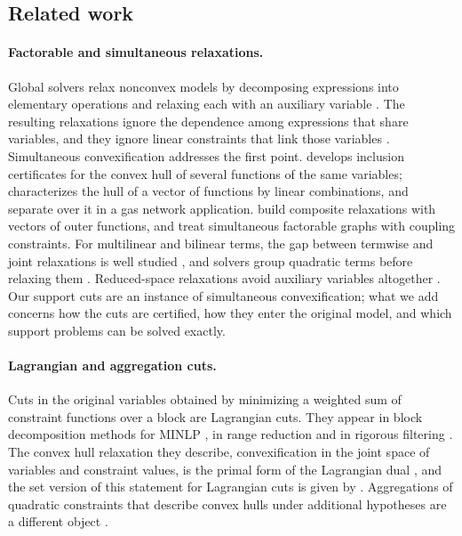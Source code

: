 \subsection{Related work}\label{sec:related}

\paragraph{Factorable and simultaneous relaxations.}
Global solvers relax nonconvex models by decomposing expressions into
elementary operations and relaxing each with an auxiliary variable
\citep{McCormick1976,SmithPantelides1999,TawarmalaniSahinidis2004,BelottiEtAl2009,BestuzhevaEtAl2025}.
The resulting relaxations ignore the dependence among expressions that
share variables, and they ignore linear constraints that link those
variables \citep{ZhuHeTawarmalani2026}. Simultaneous convexification
addresses the first point. \citet{Tawarmalani2010} develops inclusion
certificates for the convex hull of several functions of the same
variables; \citet{Ballerstein2013} characterizes the hull of a vector of
functions by linear combinations, and \citet{LiersEtAl2021} separate over
it in a gas network application. \citet{HeTawarmalani2021,HeTawarmalani2022,HeTawarmalani2024}
build composite relaxations with vectors of outer functions, and
\citet{ZhuHeTawarmalani2026} treat simultaneous factorable graphs with
coupling constraints. For multilinear and bilinear terms, the gap
between termwise and joint relaxations is well studied
\citep{Rikun1997,LuedtkeNamazifarLinderoth2012,BolandEtAl2017,BaoKhajaviradSahinidisTawarmalani2015},
and solvers group quadratic terms before relaxing them
\citep{MisenerFloudas2012}. Reduced-space relaxations avoid auxiliary
variables altogether \citep{TsoukalasMitsos2014,BongartzMitsos2017,NajmanBongartzMitsos2021}.
Our support cuts are an instance of simultaneous convexification; what we
add concerns how the cuts are certified, how they enter the original
model, and which support problems can be solved exactly.

\paragraph{Lagrangian and aggregation cuts.}
Cuts in the original variables obtained by minimizing a weighted sum of
constraint functions over a block are Lagrangian cuts. They appear in
block decomposition methods for MINLP \citep{Nowak2005,KaruppiahGrossmann2008,WuMutsNowakHendrix2025},
in range reduction \citep{TawarmalaniSahinidis2004,GleixnerEtAl2017}
and in rigorous filtering \citep{DomesNeumaier2016}. The convex hull
relaxation they describe, convexification in the joint space of
variables and constraint values, is the primal form of the Lagrangian
dual \citep{Falk1969,Geoffrion1974,FeltenmarkKiwiel2000,LemarechalRenaud2001},
and the set version of this statement for Lagrangian cuts is given by
\citet{ChenLuedtke2022}. Aggregations of quadratic constraints that
describe convex hulls under additional hypotheses are a different object
\citep{DeyMunozSerrano2022,BlekhermanDeySun2024}.


